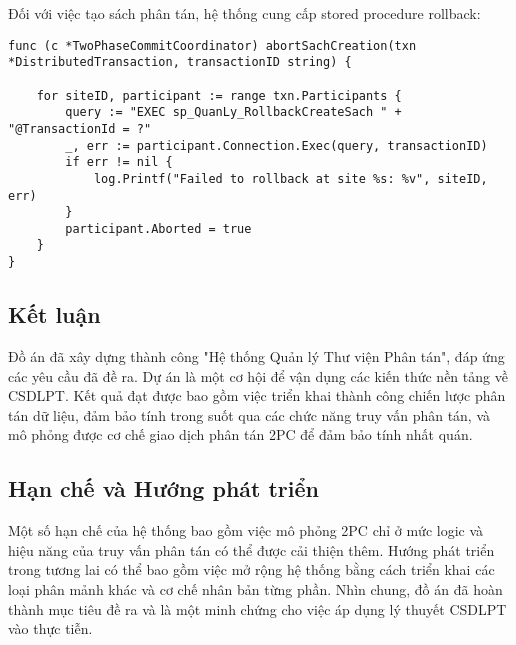 \documentclass[conference]{IEEEtran}
\begin{document}
Đối với việc tạo sách phân tán, hệ thống cung cấp stored procedure rollback:

\begin{Verbatim}[fontsize=\footnotesize,breaklines=true,breakanywhere=true]
func (c *TwoPhaseCommitCoordinator) abortSachCreation(txn *DistributedTransaction, transactionID string) {
    
    for siteID, participant := range txn.Participants {
        query := "EXEC sp_QuanLy_RollbackCreateSach " + "@TransactionId = ?"
        _, err := participant.Connection.Exec(query, transactionID)
        if err != nil {
            log.Printf("Failed to rollback at site %s: %v", siteID, err)
        }
        participant.Aborted = true
    }
}
\end{Verbatim}

\subsection{Kết luận}
Đồ án đã xây dựng thành công "Hệ thống Quản lý Thư viện Phân tán", đáp ứng các yêu cầu đã đề ra. Dự án là một cơ hội để vận dụng các kiến thức nền tảng về CSDLPT. Kết quả đạt được bao gồm việc triển khai thành công chiến lược phân tán dữ liệu, đảm bảo tính trong suốt qua các chức năng truy vấn phân tán, và mô phỏng được cơ chế giao dịch phân tán 2PC để đảm bảo tính nhất quán.

\subsection{Hạn chế và Hướng phát triển}
Một số hạn chế của hệ thống bao gồm việc mô phỏng 2PC chỉ ở mức logic và hiệu năng của truy vấn phân tán có thể được cải thiện thêm. Hướng phát triển trong tương lai có thể bao gồm việc mở rộng hệ thống bằng cách triển khai các loại phân mảnh khác và cơ chế nhân bản từng phần. Nhìn chung, đồ án đã hoàn thành mục tiêu đề ra và là một minh chứng cho việc áp dụng lý thuyết CSDLPT vào thực tiễn.

\end{document}
